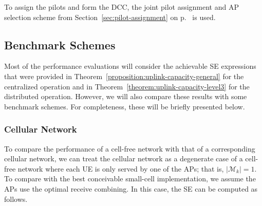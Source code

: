 To assign the pilots and form the DCC, the joint pilot assignment and AP selection scheme from Section~\ref{sec:pilot-assignment} on p.~\pageref{sec:pilot-assignment} is used.



\subsection{Benchmark Schemes}

Most of the performance evaluations will consider the achievable SE expressions that were provided in Theorem~\ref{proposition:uplink-capacity-general} for the centralized operation and in Theorem~\ref{theorem:uplink-capacity-level3} for the distributed operation. However, we will also compare these results with some benchmark schemes. For completeness, these will be briefly presented below.

\subsubsection{Cellular Network}

To compare the performance of a cell-free network with that of a corresponding cellular network, we can treat the cellular network as a degenerate case of a cell-free network where each UE is only served by one of the APs; that is, $|\mathcal{M}_k|=1$. To compare with the best conceivable small-cell implementation, we assume the APs use the optimal receive combining. In this case, the SE can be computed as follows.

